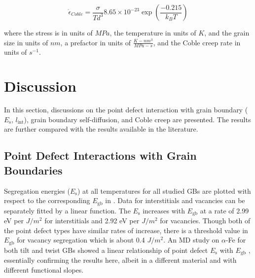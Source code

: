 \documentclass[review]{elsarticle}
\begin{document}
\begin{equation}
\label{eq:coble2}
\dot{\epsilon}_{Coble} =\frac{\sigma}{T d^{3}} 8.65 \times 10^{-23} \exp\left(\frac{-0.215}{k_{B} T}\right)
\end{equation}

\noindent where the stress is in units of $MPa$, the temperature in units of $K$, and the grain size in units of $nm$, a prefactor in units of $\frac{K-nm^{3}}{MPa-s}$, and the Coble creep rate in units of $s^{-1}$. 

\FloatBarrier

\section{Discussion}

In this section, discussions on the point defect interaction with grain boundary ($E_{\mathrm{s}}$, $l_{\mathrm{int}}$), grain boundary self-diffusion, and Coble creep are presented. The results are further compared with the results available in the literature. 

\subsection{Point Defect Interactions with Grain Boundaries}

\par Segregation energies ($E_{\mathrm{s}}$) at all temperatures for all studied GBs are plotted with respect to the corresponding  $E_{\mathrm{gb}}$  in . Data for interstitials and vacancies can be separately fitted by a linear function. The $E_{\mathrm{s}}$ increases with  $E_{\mathrm{gb}}$  at a rate of 2.99 eV per $J/m{^2}$ for interstitials and 2.92 eV per $J/m^2$ for vacancies. Though both of the point defect types have similar rates of increase, there is a threshold value in $E_{\mathrm{gb}}$ for vacancy segregation which is about 0.4 $J/m^2$. An MD study on $\alpha$-Fe for both tilt and twist GBs showed a linear relationship of point defect $E_{\mathrm{s}}$ with $E_{\mathrm{gb}}$ \cite{tschopp2012probing}, essentially confirming the results here, albeit in a different material and with different functional slopes. 
\end{document}
